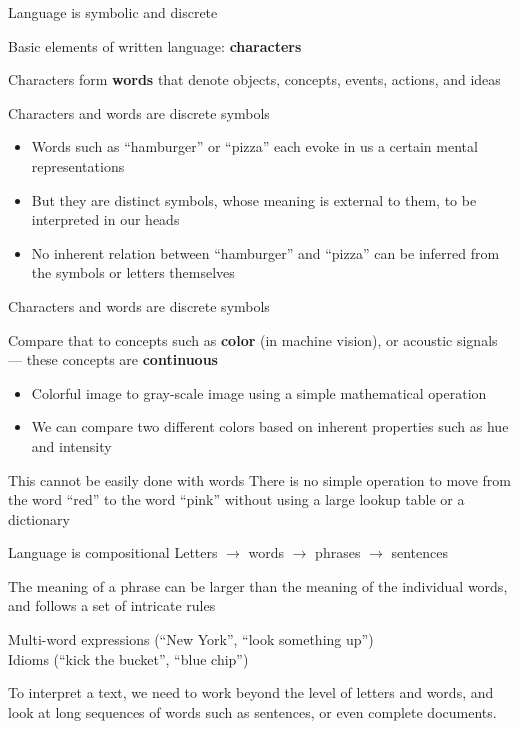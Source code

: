 \documentclass[12pt,aspectratio=169,handout]{beamer}
\begin{document}
\begin{frame}{Language is symbolic and discrete}

Basic elements of written language: \textbf{characters}

Characters form \textbf{words} that denote objects, concepts, events, actions, and ideas

\begin{block}{Characters and words are discrete symbols}
\begin{itemize}
	\item Words such as ``hamburger'' or ``pizza'' each evoke in us a certain mental representations
	\item But they are distinct symbols, whose meaning is external to them, to be interpreted in our heads
	\item No inherent relation between ``hamburger'' and ``pizza'' can be inferred from the symbols or letters themselves
\end{itemize}
\end{block}
	
\end{frame}

\begin{frame}{Characters and words are discrete symbols}

Compare that to concepts such as \textbf{color} (in machine vision), or acoustic
signals --- these concepts are \textbf{continuous}

\begin{itemize}
	\item Colorful image to gray-scale image using a simple mathematical operation
	\item We can compare two different colors based on inherent properties such as hue and intensity
\end{itemize}

\begin{block}{This cannot be easily done with words}
There is no simple operation to move from the word ``red'' to the word ``pink'' without using a large lookup table or a dictionary
\end{block}

\end{frame}


\begin{frame}{Language is compositional}
Letters $\to$ words $\to$ phrases $\to$ sentences

The meaning of a phrase can be larger than the meaning of the individual words,	and follows a set of intricate rules

\begin{example}
Multi-word expressions (``New York'', ``look something up'') \\
Idioms (``kick the bucket'', ``blue chip'')
\end{example}
	
To interpret a text, we need to work beyond the level of letters and words, and look at long sequences of words such as sentences, or even complete documents.
\end{frame}
\end{document}
